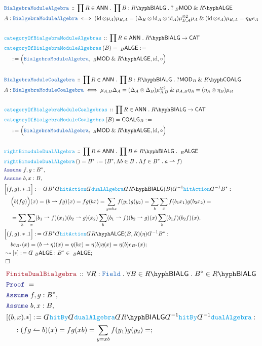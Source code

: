 \documentclass[12pt]{scrartcl}%
\newcommand{\TYPE}[1]{\textcolor{NavyBlue}{\mathtt{#1}}}%
\newcommand{\FUNC}[1]{\textcolor{Cerulean}{\mathtt{#1}}}%
\newcommand{\LOGIC}[1]{\textcolor{Blue}{\mathtt{#1}}}%
\newcommand{\THM}[1]{\textcolor{Maroon}{\mathtt{#1}}}%
\renewcommand{\.}{\; . \;} %
\newcommand{\de}{: \kern 0.1pc =} %
\newcommand{\Act}[1]{\left( #1 \right)} %
\newcommand{\Theorem}[2]{& \THM{#1} \, :: \, #2 \\ & \Proof = \\ } %
\newcommand{\DeclareType}[2]{& \TYPE{#1} \, :: \, #2 \\}%
\newcommand{\DefineType}[3]{& #1 : \TYPE{#2} \iff #3 \\}%
\newcommand{\DeclareFunc}[2]{& \FUNC{#1} \, :: \, #2 \\}%
\newcommand{\DefineNamedFunc}[4]{&  \FUNC{#1}\Act{#2} = #3 \de #4 \\}%
\newcommand{\NewLine}{\\ & \kern 1pc}%
\newcommand{\Page}[1]{ \begin{align*} #1 \end{align*}  }%
\newcommand{ \bd }{ \ByDef }%
\renewcommand{\And}{\; \& \;}%
\DeclareMathOperator*{\id}{id}%
\newcommand{\Say}[3]{& #1 \de #2 : #3, \\} %
\newcommand{\Conclude}[3]{& #1 \de #2 : #3; \\}%
\newcommand{\DeriveConclude}[3]{& \leadsto #1 \de #2 : #3 ; \\} %
\newcommand{\Assume}[2]{& \LOGIC{Assume} \; #1 : #2, \\} %
\newcommand{\QED}{\; \square} %
\newcommand{\EndProof}{& \QED \\} %
\newcommand{\ByDef}{\rotatebox[origin=c]{-180}{$D$}}%
\newcommand{\Proof}{\LOGIC{Proof} \; } %
\newcommand{\CAT}{\mathsf{CAT}} %
\newcommand{\Field}{\TYPE{Field}}
\newcommand{\ANN}{\mathsf{ANN}} %
\newcommand{\LALGE}[1]{#1\hyph\mathsf{ALGE}}%
\newcommand{\COALG}[1]{#1\hyph\mathsf{COALG}}%
\newcommand{\hit}{\rightharpoonup}
\newcommand{\hitBy}{\leftharpoonup}
\newcommand{\LAMOD}[1]{{\;}_{#1}\mathsf{MOD}}%
\newcommand{\RAMOD}[1]{\mathsf{MOD}_{#1}}%
\newcommand{\BIALG}[1]{#1\hyph\mathsf{BIALG}}%
\newcommand{\LBALG}[1]{{\;}_{#1}\mathsf{ALGE}}%
\newcommand{\RBCOALG}[1]{\mathsf{COALG}_{#1}}%
\begin{document}
\Page{
	\DeclareType{BialgebraModuleAlgebra}{\prod R \in \ANN \. \prod B : \BIALG{R} \. ?\LAMOD{B} \And \LALGE{R}}
	\DefineType{A}{BialgebraModuleAlgebra}{ 
		(\id \otimes \mu_A) \mu_{B,A} = (\Delta_B \otimes {\id}_A \otimes {\id}_A)\mu_{B,A}^{\otimes 2} \mu_A
		\And 
		(\id \otimes e_A) \mu_{B,A} =   \eta_B  e_A 
	}
	\\
	\DeclareFunc{categoryOfBialgebraModuleAlgebras}
	{
		\prod R \in \ANN \. \BIALG{R} \to \CAT
	}
	\DefineNamedFunc{categoryOfBialgebraModuleAlgebras}
	{B}{\LBALG{B}}{ \NewLine \de \Big( \TYPE{BialgebraModuleAlgebra}, \LAMOD{B} \And \LALGE{R},  \id, \circ\Big) }
	\\
	\DeclareType{BialgebraModuleCoalgebra}{\prod R \in \ANN \. \prod B : \BIALG{R} \. ?\RAMOD{B} \And \COALG{R}}
	\DefineType{A}{BialgebraModuleCoalgebra}{ 
		\mu_{A,B} \Delta_A =  (\Delta_A \otimes \Delta_B)\mu_{A,B}^{\otimes 2}  \And
		\mu_{A,B} \eta_A =  (\eta_A \otimes \eta_B) \mu_R
	}
	\\
	\DeclareFunc{categoryOfBialgebraModuleCoalgebras}
	{
		\prod R \in \ANN \. \BIALG{R} \to \CAT
	}
	\DefineNamedFunc{categoryOfBialgebraModuleCoalgebra}
	{B}{\RBCOALG{B}}{ \NewLine \de \Big( \TYPE{BialgebraModuleAlgebra}, \LAMOD{B} \And \LALGE{R},  \id, \circ\Big) }
	\\
	\DeclareFunc{rightBimoduleDualAlgebra}{\prod R \in \ANN \. \prod B \in \BIALG{R} \. \LBALG{B} }
	\DefineNamedFunc{rightBimoduleDualAlgebra}{}{B^*}{(B^*, \Lambda b \in B \. \Lambda f \in B^* \. a \hit f)}
	\Assume{f,g}{B^\circ}
	\Assume{b,x}{B}
	\Say{\Big[(f,g).*.1\Big]}{ 
		\bd B^* 
		\bd \FUNC{hitAction} 
		\bd \FUNC{dualAlgebra}
		\bd \BIALG{R}(B)  
		\bd^{-1} \FUNC{hitAction}
		\bd^{-1} B^*
	}
	{
		\NewLine
		\Big(b(fg)\Big)(x) =
		(b \hit fg)(x) =
		fg(bx) =
		\sum_{y=bx} f(y_1)g(y_2) =
		\sum_{b} \sum_{x} f(b_1x_1)g(b_2x_2) = \NewLine =  
		\sum_{b} \sum_{x} (b_1 \hit f)(x_1)(b_2 \hit g)(x_2)
		\sum_{b} (b_1 \hit f)(b_2 \hit g)(x)
		\sum_{b} (b_1 f)(b_2 f)(x)
	}
	\Conclude{\Big[(f,g).*.1 \Big]}
	{ \bd B^* \bd \FUNC{hitAction}  \bd \LALGE{R}(B,R)(\eta)\bd^{-1} B^*   }
	{
		\NewLine
		be_{B^*}(x) =
		(b \hit \eta)(x) =
		\eta(bx) =
		\eta(b)\eta(x) =
		\eta(b) e_{B^*}(x)
	}
	\DeriveConclude{[*]}{\bd \LBALG{B}}{B^* \in \LBALG{B}}
	\EndProof
}\Page{
	\Theorem{FiniteDualBialgebra}{\forall R : \Field \. \forall B \in \BIALG{R} \. B^\circ \in \BIALG{R}}
	\Assume{f,g}{B^\circ}
	\Assume{b,x}{B}
	\Conclude{[(b,x).*]}{ \bd \FUNC{hitBy} \bd \FUNC{dualAlgebra} \bd \BIALG{R} \bd^{-1} \FUNC{hitBy} \bd^{-1}\FUNC{dualAlgebra} }{ 
		\NewLine :
		(fg \hitBy b)(x) =
		fg(xb) = 
		\sum_{y = xb} f(y_1)g(y_2) =
}}
\end{document}
